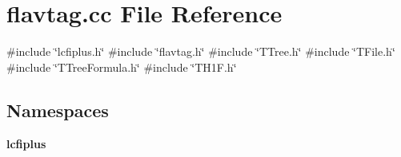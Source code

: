 \section{flavtag.\+cc File Reference}
\label{flavtag_8cc}
{\ttfamily \#include \char`\"{}lcfiplus.\+h\char`\"{}}\newline
{\ttfamily \#include \char`\"{}flavtag.\+h\char`\"{}}\newline
{\ttfamily \#include \char`\"{}T\+Tree.\+h\char`\"{}}\newline
{\ttfamily \#include \char`\"{}T\+File.\+h\char`\"{}}\newline
{\ttfamily \#include \char`\"{}T\+Tree\+Formula.\+h\char`\"{}}\newline
{\ttfamily \#include \char`\"{}T\+H1\+F.\+h\char`\"{}}\newline
\subsection*{Namespaces}
\begin{DoxyCompactItemize}
\item 
 \textbf{ lcfiplus}
\end{DoxyCompactItemize}
